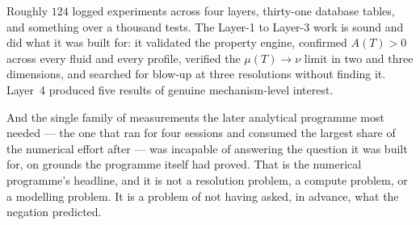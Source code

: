 \begin{obsv}
\label{obs:numerics-verdict}
Roughly \(124\) logged experiments across four layers, thirty-one database
tables, and something over a thousand tests. The Layer-1 to Layer-3 work is
sound and did what it was built for: it validated the property engine,
confirmed \(A(T)>0\) across every fluid and every profile, verified the
\(\mu(T)\to\nu\) limit in two and three dimensions, and searched for blow-up
at three resolutions without finding it. Layer~4 produced five results of
genuine mechanism-level interest.

\smallskip
And the single family of measurements the later analytical programme most
needed --- the one that ran for four sessions and consumed the largest share
of the numerical effort after  --- was incapable of answering the
question it was built for, on grounds the programme itself had proved. That is
the numerical programme's headline, and it is not a resolution problem, a
compute problem, or a modelling problem. It is a problem of not having asked,
in advance, what the negation predicted.
\end{obsv}
